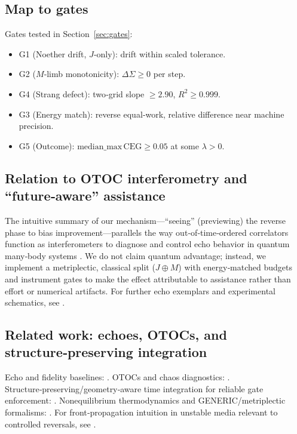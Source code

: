 \documentclass{article}
\begin{document}
\subsection*{Map to gates}
Gates tested in Section~\ref{sec:gates}:
\begin{itemize}[leftmargin=*]
  \item G1 (Noether drift, $J$‑only): drift within scaled tolerance.
  \item G2 ($M$‑limb monotonicity): $\Delta \Sigma \ge 0$ per step.
  \item G4 (Strang defect): two‑grid slope $\ge 2.90$, $R^2 \ge 0.999$.
  \item G3 (Energy match): reverse equal‑work, relative difference near machine precision.
  \item G5 (Outcome): $\mathrm{median\_max\,CEG} \ge 0.05$ at some $\lambda>0$.
\end{itemize}

\subsection*{Relation to OTOC interferometry and ``future‑aware'' assistance}
The intuitive summary of our mechanism—“seeing” (previewing) the reverse phase to bias improvement—parallels the way out‑of‑time‑ordered correlators function as interferometers to diagnose and control echo behavior in quantum many‑body systems \citep{GoogleQAIEdgeErgodicity2025}. We do not claim quantum advantage; instead, we implement a metriplectic, classical split ($J \oplus M$) with energy‑matched budgets and instrument gates to make the effect attributable to assistance rather than effort or numerical artifacts. For further echo exemplars and experimental schematics, see \citet{GoogleQAIESM2025,LiZhang2025SpinEchoGeometry}.

\subsection*{Related work: echoes, OTOCs, and structure‑preserving integration}
Echo and fidelity baselines: \citet{Hahn1950,Peres1984,JalabertPastawski2001,GorinProsenSeligmanZnidaric2006}. OTOCs and chaos diagnostics: \citet{LarkinOvchinnikov1969,ShenkerStanford2014,MaldacenaShenkerStanford2016,Swingle2018}. Structure‑preserving/geometry‑aware time integration for reliable gate enforcement: \citet{HairerLubichWanner2006,LeimkuhlerReich2004}. Nonequilibrium thermodynamics and GENERIC/metriplectic formalisms: \citet{Ottinger2005BET,Grmela2018}. For front‑propagation intuition in unstable media relevant to controlled reversals, see \citet{vanSaarloos2003FrontPropagation}.
\end{document}
